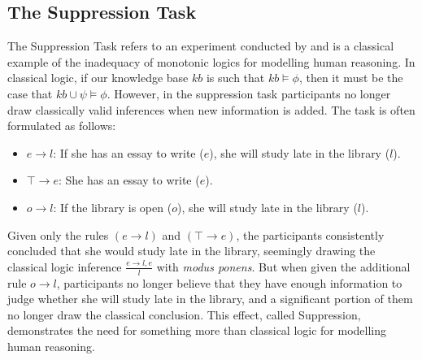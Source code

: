 \documentclass{article}
\begin{document}
\subsection{The Suppression Task} \label{ssec:sup}
The Suppression Task refers to an experiment conducted by \cite{byrne1989suppressing} and is a classical example of the inadequacy of monotonic logics for modelling human reasoning. In classical logic, if our knowledge base $kb$ is such that $kb \models \phi$, then it must be the case that $kb \cup \psi \models \phi$. However, in the suppression task participants no longer draw classically valid inferences when new information is added. The task is often formulated as follows:

\begin{itemize}
\item $e \rightarrow l$: If she has an essay to write ($e$), she will study late in the library ($l$).
\item $\top \rightarrow e$: She has an essay to write ($e$).
\item $o\rightarrow l$: If the library is open ($o$), she will study late in the library ($l$).
\end{itemize}

Given only the rules $(e \rightarrow l)$ and $(\top \rightarrow e)$, the participants consistently concluded that she would study late in the library, seemingly drawing the classical logic inference $\frac{e \rightarrow l, e}{l}$ with \textit{modus ponens}. But when given the additional rule $o\rightarrow l$, participants no longer believe that they have enough information to judge whether she will study late in the library, and a significant portion of them no longer draw the classical conclusion. This effect, called Suppression, demonstrates the need for something more than classical logic for modelling human reasoning.
\end{document}
